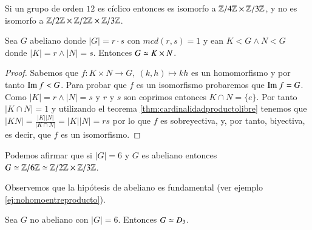 \begin{ej}
	Si un grupo de orden $12$ es cíclico entonces es isomorfo a $\mathbb{Z}/4\mathbb{Z} \times \mathbb{Z}/3\mathbb{Z}$, y no es isomorfo a $\mathbb{Z}/2\mathbb{Z} \times \mathbb{Z}/2\mathbb{Z} \times \mathbb{Z}/3\mathbb{Z}$.
\end{ej}

\begin{thm}
	Sea $G$ abeliano donde $|G| = r\cdot s$ con $mcd(r,s) = 1$ y ean $K < G \land N < G$ donde $|K| = r \land |N| = s$. Entonces $G \simeq K \times N$.
\end{thm}

\begin{proof}
	Sabemos que $f:K\times N \to G,\ (k, h) \mapsto kh$ es un homomorfismo y por tanto $\text{Im } f < G$. Para probar que $f$ es un isomorfismo probaremos que $\text{Im } f = G$. Como $|K| = r \land |N| = s$ y $r$ y $s$ son coprimos entonces $K \cap N = \{e\}$. Por tanto $|K \cap N| = 1$ y utilizando el teorema \ref{thm:cardinalidadproductolibre} tenemos que $|KN| = \frac{|K||N|}{|K \cap N|} = |K| |N| = rs$ por lo que $f$ es sobreyectiva, y, por tanto, biyectiva, es decir, que $f$ es un isomorfismo.
\end{proof}

\begin{ej}
	Podemos afirmar que si $|G| = 6$ y $G$ es abeliano entonces $G \simeq \mathbb{Z}/6\mathbb{Z} \simeq \mathbb{Z}/2\mathbb{Z} \times \mathbb{Z}/3\mathbb{Z}$.
\end{ej}

Observemos que la hipótesis de abeliano es fundamental (ver ejemplo \ref{ej:nohomoentreproducto}).



\begin{ej}
	\label{ej:orden6noabisomd3}
	Sea $G$ no abeliano con $|G| = 6$. Entonces $G \simeq D_3$.
\end{ej}

